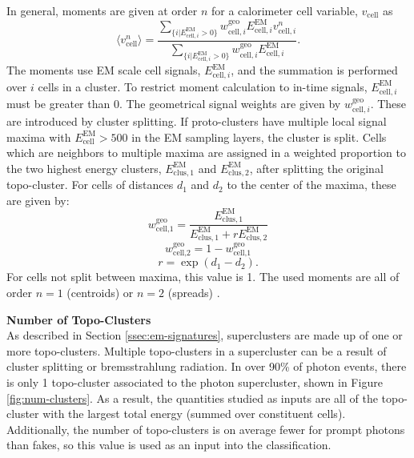 In general, moments are given at order $n$ for a calorimeter cell variable, $v_{\text{cell}}$ as
\begin{equation}\label{eqn:moment-calculation}
    \langle v_{\text{cell}}^{n} \rangle = \frac{
        \sum_{\{i|E_{\text{cell},i}^{\text{EM}}>0\}}w^{\text{geo}}_{\text{cell},i} E_{\text{cell},i}^{\text{EM}} v_{\text{cell},i}^{n}
    }
    {
        \sum_{\{i|E_{\text{cell},i}^{\text{EM}}>0\}}w^{\text{geo}}_{\text{cell},i} E_{\text{cell},i}^{\text{EM}}
    }.
\end{equation}
The moments use \gls{EM} scale cell signals, $E_{\text{cell},i}^{\text{EM}}$, and the summation is performed over $i$ cells in a cluster. To restrict moment calculation to in-time signals, $E_{\text{cell},i}^{\text{EM}}$ must be greater than 0. The geometrical signal weights are given by $w^{\text{geo}}_{\text{cell},i}$. These are introduced by cluster splitting. If proto-clusters have multiple local signal maxima with $E_{\text{cell}}^{\text{EM}} > 500$ in the \gls{EM} sampling layers, the cluster is split. Cells which are neighbors to multiple maxima are assigned in a weighted proportion to the two highest energy clusters, $E_{\text{clus},1}^{\text{EM}}$ and $E_{\text{clus},2}^{\text{EM}}$, after splitting the original topo-cluster. For cells of distances $d_1$ and $d_2$ to the center of the maxima, these are given by: 
\begin{equation}
    w^{\text{geo}}_{\text{cell,1}} = \frac{E_{\text{clus},1}^{\text{EM}}}{E_{\text{clus},1}^{\text{EM}} + r E_{\text{clus},2}^{\text{EM}}}
\end{equation}
\begin{equation}
    w^{\text{geo}}_{\text{cell,2}} = 1-w^{\text{geo}}_{\text{cell,1}}
\end{equation}
\begin{equation}
    r = \exp(d_1 -d_2).
\end{equation}
For cells not split between maxima, this value is 1. The used moments are all of order $n=1$ (centroids) or $n=2$ (spreads) \cite{topo-cluster}.

\noindent\textbf{Number of Topo-Clusters}\\
\indent As described in Section \ref{ssec:em-signatures}, superclusters are made up of one or more topo-clusters. Multiple topo-clusters in a supercluster can be a result of cluster splitting or bremsstrahlung radiation. In over 90\% of photon events, there is only 1 topo-cluster associated to the photon supercluster, shown in Figure \ref{fig:num-clusters}. As a result, the quantities studied as inputs are all of the topo-cluster with the largest total energy (summed over constituent cells). Additionally, the number of topo-clusters is on average fewer for prompt photons than fakes, so this value is used as an input into the classification.


